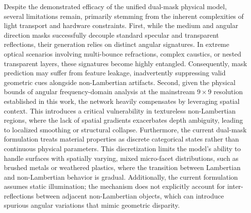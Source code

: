 Despite the demonstrated efficacy of the unified dual-mask physical model, several limitations remain, primarily stemming from the inherent complexities of light transport and hardware constraints. First, while the medium and angular direction masks successfully decouple standard specular and transparent reflections, their generation relies on distinct angular signatures. In extreme optical scenarios involving multi-bounce refractions, complex caustics, or nested transparent layers, these signatures become highly entangled. Consequently, mask prediction may suffer from feature leakage, inadvertently suppressing valid geometric cues alongside non-Lambertian artifacts. Second, given the physical bounds of angular frequency-domain analysis at the mainstream $9 \times 9$ resolution established in this work, the network heavily compensates by leveraging spatial context. This introduces a critical vulnerability in textureless non-Lambertian regions, where the lack of spatial gradients exacerbates depth ambiguity, leading to localized smoothing or structural collapse. Furthermore, the current dual-mask formulation treats material properties as discrete categorical states rather than continuous physical parameters. This discretization limits the model's ability to handle surfaces with spatially varying, mixed micro-facet distributions, such as brushed metals or weathered plastics, where the transition between Lambertian and non-Lambertian behavior is gradual. Additionally, the current formulation assumes static illumination; the mechanism does not explicitly account for inter-reflections between adjacent non-Lambertian objects, which can introduce spurious angular variations that mimic geometric disparity.


